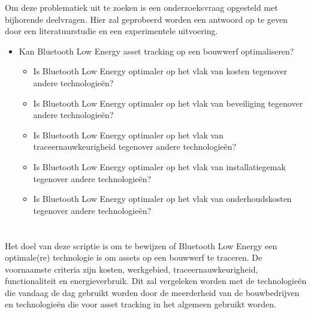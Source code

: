 Om deze problematiek uit te zoeken is een onderzoeksvraag opgesteld met bijhorende deelvragen. Hier zal geprobeerd worden een antwoord op te geven door een literatuurstudie en een experimentele uitvoering.

\begin{itemize}
    \item Kan Bluetooth Low Energy asset tracking op een bouwwerf optimaliseren?
    \begin{itemize}
        \item Is Bluetooth Low Energy optimaler op het vlak van kosten tegenover andere technologieën?
        \item Is Bluetooth Low Energy optimaler op het vlak van beveiliging tegenover andere technologieën?
        \item Is Bluetooth Low Energy optimaler op het vlak van traceernauwkeurigheid tegenover andere technologieën?
        \item Is Bluetooth Low Energy optimaler op het vlak van installatiegemak tegenover andere technologieën?
        \item Is Bluetooth Low Energy optimaler op het vlak van onderhoudskosten tegenover andere technologieën?
    \end{itemize}
\end{itemize}

\section{}%
\label{sec:onderzoeksdoelstelling}


Het doel van deze scriptie is om te bewijzen of Bluetooth Low Energy een optimale(re) technologie is om assets op een bouwwerf te traceren. De voornaamste criteria zijn kosten, werkgebied, traceernauwkeurigheid, functionaliteit en energieverbruik. Dit zal vergeleken worden met de technologieën die vandaag de dag gebruikt worden door de meerderheid van de bouwbedrijven en technologieën die voor asset tracking in het algemeen gebruikt worden.

\section{}%
\label{sec:opzet-bachelorproef}


